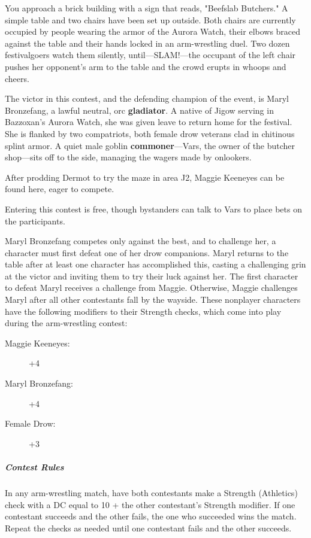 \documentclass[10pt,a4paper,twoside,fancy,bg=print,twocolumn,openany,nodeprecatedcode]{dndbook}
\begin{document}
\begin{DndReadAloud}{}
You approach a brick building with a sign that reads, "Beefslab Butchers." A simple table and two chairs have been set up outside. Both chairs are currently occupied by people wearing the armor of the Aurora Watch, their elbows braced against the table and their hands locked in an arm-wrestling duel. Two dozen festivalgoers watch them silently, until—SLAM!—the occupant of the left chair pushes her opponent's arm to the table and the crowd erupts in whoops and cheers.

\end{DndReadAloud}

The victor in this contest, and the defending champion of the event, is Maryl Bronzefang, a lawful neutral, orc \textbf{gladiator}. A native of Jigow serving in Bazzoxan's Aurora Watch, she was given leave to return home for the festival. She is flanked by two compatriots, both female drow veterans clad in chitinous splint armor. A quiet male goblin \textbf{commoner}—Vars, the owner of the butcher shop—sits off to the side, managing the wagers made by onlookers.

After prodding Dermot to try the maze in area J2, Maggie Keeneyes can be found here, eager to compete.

Entering this contest is free, though bystanders can talk to Vars to place bets on the participants.

Maryl Bronzefang competes only against the best, and to challenge her, a character must first defeat one of her drow companions. Maryl returns to the table after at least one character has accomplished this, casting a challenging grin at the victor and inviting them to try their luck against her. The first character to defeat Maryl receives a challenge from Maggie. Otherwise, Maggie challenges Maryl after all other contestants fall by the wayside. These nonplayer characters have the following modifiers to their Strength checks, which come into play during the arm-wrestling contest:


\begin{description}
\item[Maggie Keeneyes:]
+4
\item[Maryl Bronzefang:]
+4
\item[Female Drow:]
+3
\end{description}

\subparagraph{Contest Rules}
In any arm-wrestling match, have both contestants make a Strength (Athletics) check with a DC equal to 10 + the other contestant's Strength modifier. If one contestant succeeds and the other fails, the one who succeeded wins the match. Repeat the checks as needed until one contestant fails and the other succeeds.
\end{document}
